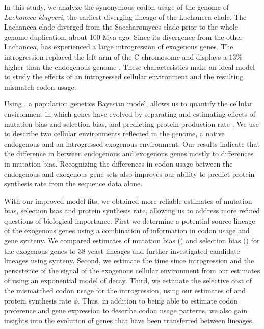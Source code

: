 In this study, we analyze the synonymous codon usage of the genome of \textit{Lachancea kluyveri}, the earliest diverging lineage of the Lachancea clade.
The Lachancea clade diverged from the Saccharomyces clade prior to the whole genome duplication, about 100 Mya ago.
Since its divergence from the other Lachancea, \kluyveri  has experienced a large introgression of exogenous genes.
The introgression replaced the left arm of the C chromosome and displays a $13 \%$ higher \GC than the endogenous \kluyveri genome \citep{payen2009, friedrich2015}.
These characteristics make \kluyveri an ideal model to study the effects of an introgressed cellular environment and the resulting mismatch codon usage.

Using \ROC, a population genetics Bayesian model, allows us to quantify the cellular environment in which genes have evolved by separating and estimating effects of mutation bias and selection bias, and predicting protein production rate \citep{gilchrist2015}.
We use \ROC to describe two cellular environments reflected in the \kluyveri genome, a native endogenous and an introgressed exogenous environment.
Our results indicate that the difference in \GC between endogenous and exogenous genes mostly to differences in mutation bias.
Recognizing the differences in codon usage between the endogenous and exogenous gene sets also improves our ability to predict protein synthesis rate from the sequence data alone.

With our improved model fits, we obtained more reliable estimates of mutation bias, selection bias and protein synthesis rate, allowing us to address more refined questions of biological importance.
First we determine a potential source lineage of the exogenous genes using a combination of information in codon usage and gene synteny.
We compared estimates of mutation bias (\DM) and selection bias (\DE) for the exogenous genes to 38 yeast lineages and further investigated candidate lineages using synteny.
Second, we estimate the time since introgression and the persistence of the signal of the exogenous cellular environment from our estimates of \DM using an exponential model of decay.
Third, we estimate the selective cost of the mismatched codon usage for the introgression, using our estimates of \DE and protein synthesis rate $\phi$. 
Thus, in addition to being able to estimate codon preference and gene expression to describe codon usage patterns, we also gain insights into the evolution of genes that have been transferred between lineages.

